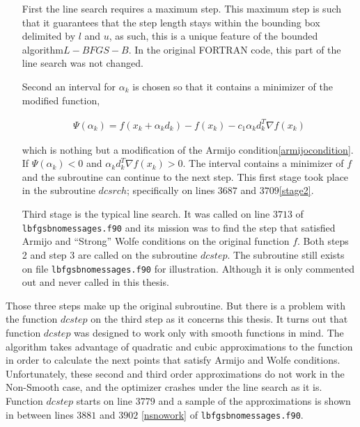 \begin{enumerate}
\item[First] the line search requires a maximum step. This maximum step is such that it guarantees that the step length stays within the bounding box delimited by $l$ and $u$, as such, this is a unique feature of the bounded algorithm$L-BFGS-B$. In the original \textsc{FORTRAN} code, this part of the line search was not changed.

\item[Second] an interval for $\alpha_k$ is chosen so that it contains a minimizer of the modified function,

\begin{equation} \label{armijomod}
  \begin{aligned}
    \Psi(\alpha_k) = f(x_k + \alpha_k d_k) - f(x_k) - c_1 \alpha_k d_k^T  \nabla f(x_k)
  \end{aligned}
\end{equation} 

 which is nothing but a modification of the Armijo condition\ref{armijocondition}. If $\Psi(\alpha_k) < 0$ and $\alpha_k d_k^T \nabla f(x_k) > 0$. The interval contains a minimizer of $f$ and the subroutine can continue to the next step. This first stage took place in the subroutine $dcsrch$; specifically on lines $3687$ and $3709$\ref{stage2}.

\item[Third] stage is the typical line search\citep{nocedal}. It was called on line $3713$ of \texttt{lbfgsbnomessages.f90} and its mission was to find the step that satisfied Armijo and ``Strong'' Wolfe conditions on the original function $f$. Both steps 2 and step 3 are called on the subroutine $dcstep$. The subroutine still exists on file \texttt{lbfgsbnomessages.f90} for illustration. Although it is only commented out and never called in this thesis.

\end{enumerate}

Those three steps make up the original subroutine. But there is a problem with the function $dcstep$ on the third step as it concerns this thesis. It turns out that function $dcstep$ was designed to work only with smooth functions in mind. The algorithm takes advantage of quadratic and cubic approximations to the function in order to calculate the next points that satisfy Armijo and Wolfe conditions. Unfortunately, these second and third order approximations do not work in the Non-Smooth case, and the optimizer crashes under the line search as it is. Function $dcstep$ starts on line $3779$ and a sample of the approximations is shown in between lines $3881$ and $3902$ \ref{nsnowork} of \texttt{lbfgsbnomessages.f90}.

